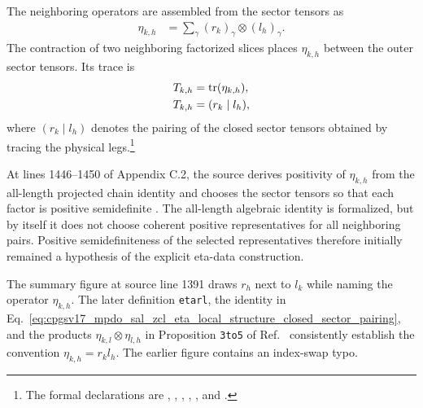 \documentclass{article}
\begin{document}
The neighboring operators are assembled from the sector tensors as
\begin{align}
    \eta_{k,h}
        &=
        \sum_{\gamma}
        (r_k)_{\gamma}\otimes(l_h)_{\gamma}.
    \label{eq:cpgsv17_mpdo_sal_zcl_eta_local_structure_sector_eta_definition}
\end{align}
The contraction of two neighboring factorized slices places $\eta_{k,h}$
between the outer sector tensors. Its trace is
\begin{align}
    T_{k,h}
        &=
        \operatorname{tr}(\eta_{k,h}),
    \label{eq:cpgsv17_mpdo_sal_zcl_eta_local_structure_trace_matrix_entry}\\
    T_{k,h}
        &=
        (r_k\mid l_h),
    \label{eq:cpgsv17_mpdo_sal_zcl_eta_local_structure_closed_sector_pairing}
\end{align}
where $(r_k\mid l_h)$ denotes the pairing of the closed sector tensors obtained
by tracing the physical legs.\footnote{The formal declarations are
,
,
,
,
, and
.}

At lines 1446--1450 of Appendix C.2, the source derives positivity of
$\eta_{k,h}$ from the all-length projected chain identity and chooses the
sector tensors so that each factor is positive semidefinite
\cite{Cirac2016MPDO_arXiv}. The all-length algebraic identity is formalized,
but by itself it does not choose coherent positive representatives for all
neighboring pairs. Positive semidefiniteness of the selected representatives
therefore initially remained a hypothesis of the explicit eta-data
construction.

The summary figure  at source line 1391 draws $r_h$
next to $l_k$ while naming the operator $\eta_{k,h}$. The later definition
\texttt{etarl}, the identity in
Eq.~\ref{eq:cpgsv17_mpdo_sal_zcl_eta_local_structure_closed_sector_pairing},
and the products $\eta_{k,l}\otimes\eta_{l,h}$ in Proposition \texttt{3to5}
of Ref.~\cite{Cirac2016MPDO_arXiv} consistently establish the convention
$\eta_{k,h}=r_k l_h$. The earlier figure contains an index-swap typo.
\end{document}

